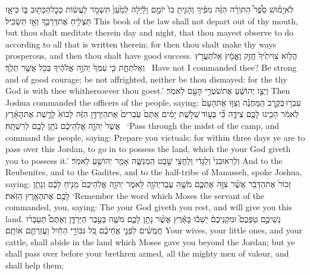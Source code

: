 {לֹֽא\maqqaf יָמ֡וּשׁ סֵ֩פֶר֩ הַתּוֹרָ֨ה הַזֶּ֜ה מִפִּ֗יךָ וְהָגִ֤יתָ בּוֹ֙ יוֹמָ֣ם וָלַ֔יְלָה לְמַ֙עַן֙ תִּשְׁמֹ֣ר לַעֲשׂ֔וֹת כְּכׇל\maqqaf הַכָּת֖וּב בּ֑וֹ כִּי\maqqaf אָ֛ז תַּצְלִ֥יחַ אֶת\maqqaf דְּרָכֶ֖ךָ וְאָ֥ז תַּשְׂכִּֽיל׃}
{This book of the law shall not depart out of thy mouth, but thou shalt meditate therein day and night, that thou mayest observe to do according to all that is written therein; for then thou shalt make thy ways prosperous, and then thou shalt have good success.}
{הֲל֤וֹא צִוִּיתִ֙יךָ֙ חֲזַ֣ק וֶאֱמָ֔ץ אַֽל\maqqaf תַּעֲרֹ֖ץ וְאַל\maqqaf תֵּחָ֑ת כִּ֤י עִמְּךָ֙ יְהֹוָ֣ה אֱלֹהֶ֔יךָ בְּכֹ֖ל אֲשֶׁ֥ר תֵּלֵֽךְ׃ \petucha }
{Have not I commanded thee? Be strong and of good courage; be not affrighted, neither be thou dismayed: for the \lord\space thy God is with thee whithersoever thou goest.’}
{וַיְצַ֣ו יְהוֹשֻׁ֔עַ אֶת\maqqaf שֹׁטְרֵ֥י הָעָ֖ם לֵאמֹֽר׃}
{Then Joshua commanded the officers of the people, saying:}
{עִבְר֣וּ \legarmeh  בְּקֶ֣רֶב הַֽמַּחֲנֶ֗ה וְצַוּ֤וּ אֶת\maqqaf הָעָם֙ לֵאמֹ֔ר הָכִ֥ינוּ לָכֶ֖ם צֵידָ֑ה כִּ֞י בְּע֣וֹד \legarmeh  שְׁלֹ֣שֶׁת יָמִ֗ים אַתֶּם֙ עֹֽבְרִים֙ אֶת\maqqaf הַיַּרְדֵּ֣ן הַזֶּ֔ה לָבוֹא֙ לָרֶ֣שֶׁת אֶת\maqqaf הָאָ֔רֶץ אֲשֶׁר֙ יְהֹוָ֣ה אֱלֹֽהֵיכֶ֔ם נֹתֵ֥ן לָכֶ֖ם לְרִשְׁתָּֽהּ׃ \petucha }
{‘Pass through the midst of the camp, and command the people, saying: Prepare you victuals; for within three days ye are to pass over this Jordan, to go in to possess the land, which the \lord\space your God giveth you to possess it.’}
{וְלָרֽאוּבֵנִי֙ וְלַגָּדִ֔י וְלַחֲצִ֖י שֵׁ֣בֶט הַֽמְנַשֶּׁ֑ה אָמַ֥ר יְהוֹשֻׁ֖עַ לֵאמֹֽר׃}
{And to the Reubenites, and to the Gadites, and to the half-tribe of Manasseh, spoke Joshua, saying:}
{זָכוֹר֙ אֶת\maqqaf הַדָּבָ֔ר אֲשֶׁ֨ר צִוָּ֥ה אֶתְכֶ֛ם מֹשֶׁ֥ה עֶבֶד\maqqaf יְהֹוָ֖ה לֵאמֹ֑ר יְהֹוָ֤ה אֱלֹֽהֵיכֶם֙ מֵנִ֣יחַ לָכֶ֔ם וְנָתַ֥ן לָכֶ֖ם אֶת\maqqaf הָאָ֥רֶץ הַזֹּֽאת׃}
{‘Remember the word which Moses the servant of the \lord\space commanded, you, saying: The \lord\space your God giveth you rest, and will give you this land.}
{נְשֵׁיכֶ֣ם טַפְּכֶם֮ וּמִקְנֵיכֶם֒ יֵשְׁב֕וּ בָּאָ֕רֶץ אֲשֶׁ֨ר נָתַ֥ן לָכֶ֛ם מֹשֶׁ֖ה בְּעֵ֣בֶר הַיַּרְדֵּ֑ן וְאַתֶּם֩ תַּעַבְר֨וּ חֲמֻשִׁ֜ים לִפְנֵ֣י אֲחֵיכֶ֗ם כֹּ֚ל גִּבּוֹרֵ֣י הַחַ֔יִל וַעֲזַרְתֶּ֖ם אוֹתָֽם׃}
{Your wives, your little ones, and your cattle, shall abide in the land which Moses gave you beyond the Jordan; but ye shall pass over before your brethren armed, all the mighty men of valour, and shall help them;}
